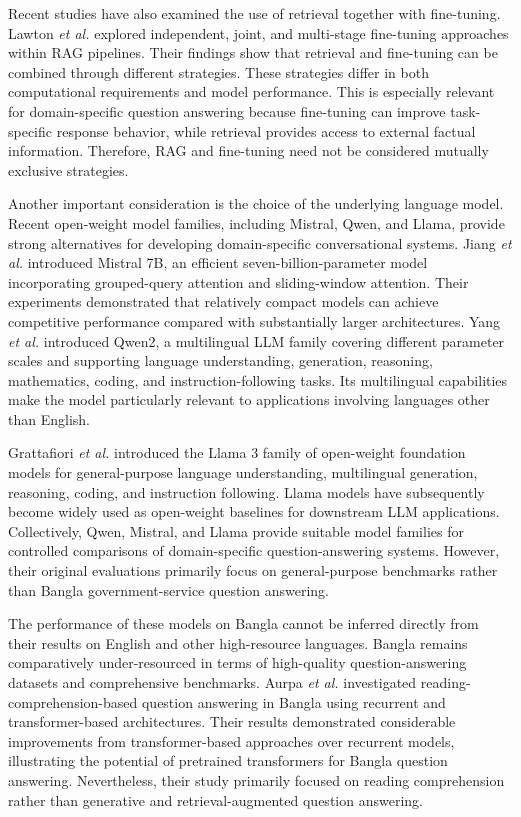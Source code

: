 \documentclass[10pt,journal,compsoc]{IEEEtran}
\begin{document}
Recent studies have also examined the use of retrieval together with fine-tuning. Lawton \textit{et al.} \cite{lawton2025ragfinetuning} explored independent, joint, and multi-stage fine-tuning approaches within RAG pipelines. Their findings show that retrieval and fine-tuning can be combined through different strategies. These strategies differ in both computational requirements and model performance. This is especially relevant for domain-specific question answering because fine-tuning can improve task-specific response behavior, while retrieval provides access to external factual information. Therefore, RAG and fine-tuning need not be considered mutually exclusive strategies.

Another important consideration is the choice of the underlying language model. Recent open-weight model families, including Mistral, Qwen, and Llama, provide strong alternatives for developing domain-specific conversational systems. Jiang \textit{et al.} \cite{jiang2023mistral} introduced Mistral 7B, an efficient seven-billion-parameter model incorporating grouped-query attention and sliding-window attention. Their experiments demonstrated that relatively compact models can achieve competitive performance compared with substantially larger architectures. Yang \textit{et al.} \cite{yang2024qwen2} introduced Qwen2, a multilingual LLM family covering different parameter scales and supporting language understanding, generation, reasoning, mathematics, coding, and instruction-following tasks. Its multilingual capabilities make the model particularly relevant to applications involving languages other than English.

Grattafiori \textit{et al.} \cite{grattafiori2024llama3} introduced the Llama 3 family of open-weight foundation models for general-purpose language understanding, multilingual generation, reasoning, coding, and instruction following. Llama models have subsequently become widely used as open-weight baselines for downstream LLM applications. Collectively, Qwen, Mistral, and Llama provide suitable model families for controlled comparisons of domain-specific question-answering systems. However, their original evaluations primarily focus on general-purpose benchmarks rather than Bangla government-service question answering.

The performance of these models on Bangla cannot be inferred directly from their results on English and other high-resource languages. Bangla remains comparatively under-resourced in terms of high-quality question-answering datasets and comprehensive benchmarks. Aurpa \textit{et al.} \cite{aurpa2022banglaqa} investigated reading-comprehension-based question answering in Bangla using recurrent and transformer-based architectures. Their results demonstrated considerable improvements from transformer-based approaches over recurrent models, illustrating the potential of pretrained transformers for Bangla question answering. Nevertheless, their study primarily focused on reading comprehension rather than generative and retrieval-augmented question answering.
\end{document}

